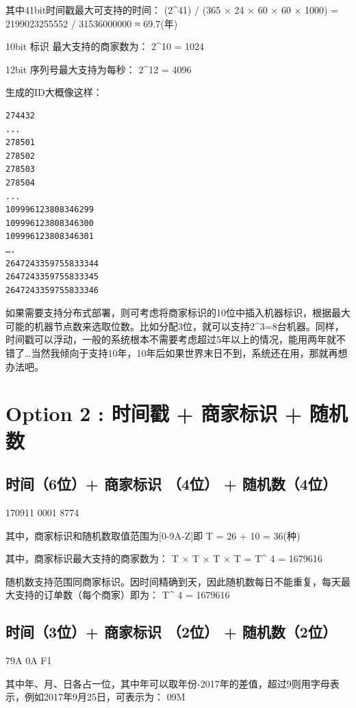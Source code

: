 \documentclass[12pt]{article}
\begin{document}
其中41bit时间戳最大可支持的时间： (2\^{}41) / (365 × 24 × 60 × 60 × 1000) = 2199023255552 / 31536000000 ≈ 69.7(年)

10bit 标识 最大支持的商家数为： 2\^{}10 = 1024

12bit 序列号最大支持为每秒： 2\^{}12 = 4096

生成的ID大概像这样：

\begin{verbatim}
274432
...
278501
278502
278503
278504
...
109996123808346299
109996123808346300
109996123808346301
….
2647243359755833344
2647243359755833345
2647243359755833346
\end{verbatim}

如果需要支持分布式部署，则可考虑将商家标识的10位中插入机器标识，根据最大可能的机器节点数来选取位数。比如分配3位，就可以支持2\^{}3=8台机器。同样，时间戳可以浮动，一般的系统根本不需要考虑超过5年以上的情况，能用两年就不错了\ldots 当然我倾向于支持10年，10年后如果世界末日不到，系统还在用，那就再想办法吧。

\section{Option 2 : 时间戳 + 商家标识 + 随机数}\label{option-2-ux65f6ux95f4ux6233-ux5546ux5bb6ux6807ux8bc6-ux968fux673aux6570}

\subsection{时间（6位）+ 商家标识 （4位） + 随机数（4位）}\label{ux65f6ux95f46ux4f4d-ux5546ux5bb6ux6807ux8bc6-4ux4f4d-ux968fux673aux65704ux4f4d}

170911 0001 8774

其中，商家标识和随机数取值范围为{[}0-9A-Z{]}即 T = 26 + 10 = 36(种)

其中，商家标识最大支持的商家数为： T × T × T × T = T\^{} 4 = 1679616

随机数支持范围同商家标识。因时间精确到天，因此随机数每日不能重复，每天最大支持的订单数（每个商家）即为： T\^{} 4 = 1679616

\subsection{时间（3位）+ 商家标识 （2位） + 随机数（2位）}\label{ux65f6ux95f43ux4f4d-ux5546ux5bb6ux6807ux8bc6-2ux4f4d-ux968fux673aux65702ux4f4d}

79A 0A F1

其中年、月、日各占一位，其中年可以取年份-2017年的差值，超过9则用字母表示，例如2017年9月25日，可表示为： 09M
\end{document}
